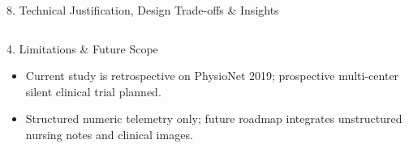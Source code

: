 \documentclass[aspectratio=169, 11pt]{beamer}
\begin{document}
\begin{frame}{8. Technical Justification, Design Trade-offs \& Insights}
\begin{columns}[T]
        \begin{block}{4. Limitations \& Future Scope}
            \scriptsize
            \begin{itemize}
                \item Current study is retrospective on PhysioNet 2019; prospective multi-center silent clinical trial planned.
                \item Structured numeric telemetry only; future roadmap integrates unstructured nursing notes and clinical images.
            \end{itemize}
        \end{block}
    \end{columns}
\end{frame}

\end{document}
